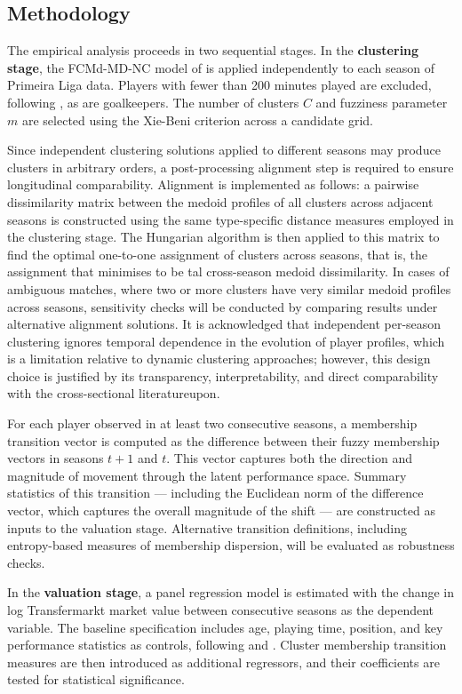 \documentclass[a4paper,11pt]{report}
\begin{document}
\subsection{Methodology}

The empirical analysis proceeds in two sequential stages. In the \textbf{clustering stage}, the FCMd-MD-NC model of \cite{durso2022robust} is applied independently to each season of Primeira Liga data. Players with fewer than 200 minutes played are excluded, following \cite{durso2022robust}, as are goalkeepers. The number of clusters $C$ and fuzziness parameter $m$ are selected using the Xie-Beni criterion across a candidate grid.

Since independent clustering solutions applied to different seasons may produce clusters in arbitrary orders, a post-processing alignment step is required to ensure longitudinal comparability. Alignment is implemented as follows: a pairwise dissimilarity matrix between the medoid profiles of all clusters across adjacent seasons is constructed using the same type-specific distance measures employed in the clustering stage. The Hungarian algorithm is then applied to this matrix to find the optimal one-to-one assignment of clusters across seasons, that is, the assignment that minimises to be tal cross-season medoid dissimilarity. In cases of ambiguous matches, where two or more clusters have very similar medoid profiles across seasons, sensitivity checks will be conducted by comparing results under alternative alignment solutions. It is acknowledged that independent per-season clustering ignores temporal dependence in the evolution of player profiles, which is a limitation relative to dynamic clustering approaches; however, this design choice is justified by its transparency, interpretability, and direct comparability with the cross-sectional literatureupon.

For each player observed in at least two consecutive seasons, a membership transition vector is computed as the difference between their fuzzy membership vectors in seasons $t+1$ and $t$. This vector captures both the direction and magnitude of movement through the latent performance space. Summary statistics of this transition — including the Euclidean norm of the difference vector, which captures the overall magnitude of the shift — are constructed as inputs to the valuation stage. Alternative transition definitions, including entropy-based measures of membership dispersion, will be evaluated as robustness checks.

In the \textbf{valuation stage}, a panel regression model is estimated with the change in log Transfermarkt market value between consecutive seasons as the dependent variable. The baseline specification includes age, playing time, position, and key performance statistics as controls, following \cite{poli2024statistical} and \cite{muller2017beyond}. Cluster membership transition measures are then introduced as additional regressors, and their coefficients are tested for statistical significance.
\end{document}
